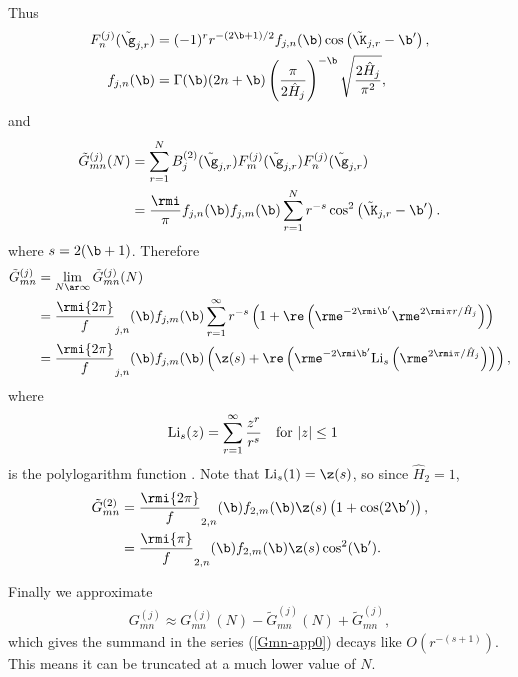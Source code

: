 \documentclass[a4paper,10pt]{article}
\begin{document}
Thus
\begin{subequations}
\begin{align}
F_n^{(j)}(\tilde \g_{j,r})&=
(-1)^{r}r^{-(2\b+1)/2}f_{j,n}(\b)\cos\left(\tilde\K_{j,r}-\b'\right),\\
f_{j,n}(\b)&=\Gamma(\b)(2n+\b)\left(\frac\pi{2\hat H_{j}}\right)^{-\b}
\sqrt{\frac{2\hat H_{j}}{\pi^{2} }},
\end{align}
\end{subequations}
and
\begin{align}\label{Gmn-app0}
\tilde G_{mn}^{(j)}(N)
 &=\sum_{r=1}^{N}B_j^{(2)}(\tilde\g_{j,r})F_m^{(j)}(\tilde\g_{j,r})F^{(j)}_n(\tilde\g_{j,r})
 \notag\\
 &=\frac\rmi\pi f_{j,n}(\b)f_{j,m}(\b)\sum_{r=1}^{N}r^{-s}
 \cos^{2}\left(\tilde\K_{j,r}-\b'\right).
 \end{align}
where $s=2(\b+1)$.
Therefore
\begin{align}\label{Gmn-app}
\tilde G_{mn}^{(j)}
&=\lim_{N\ar\infty}\tilde G_{mn}^{(j)}(N)
\notag\\
 &=\frac\rmi{2\pi} f_{j,n}(\b)f_{j,m}(\b)\sum_{r=1}^{\infty}r^{-s}
 \left (1+\re\left (\rme^{-2\rmi\b'} \rme^{2\rmi\pi r/\hat H_{j}}\right)\right)
\notag\\
 &=\frac\rmi{2\pi} f_{j,n}(\b)f_{j,m}(\b)
 \left ( \z(s)+\re\left (\rme^{-2\rmi\b'}{\rm Li}_{s} \left(\rme^{2\rmi\pi /\hat H_{j}}\right)\right)\right),
 \end{align}
 where
\begin{align}
{\rm Li}_{s}(z)&=\sum_{r=1}^{\infty}\frac{z^{r}}{r^{s}}
\quad\text{for }|z|\leq1
\end{align}
is the polylogarithm function \cite[][also see the next section]{wood1992-polylog-techrep}. Note that ${\rm Li}_{s}(1)=\z(s)$,
so since $\hat H_{2}=1$,
\begin{align}\label{Gmn-app}
\tilde G_{mn}^{(2)}
&=\frac\rmi{2\pi} f_{2,n}(\b)f_{2,m}(\b)\z(s)
 \left ( 1+\cos(2\b')\right),
 \notag\\
 &=\frac\rmi{\pi} f_{2,n}(\b)f_{2,m}(\b)\z(s)\cos^{2}(\b').
 \end{align}
 
 Finally we approximate
 \begin{align}
G_{mn}^{(j)}\approx G_{mn}^{(j)}(N)-\tilde G_{mn}^{(j)}(N)+ \tilde G_{mn}^{(j)},
\end{align}
which gives the summand in the series (\ref{Gmn-app0}) decays like $O(r^{-(s+1)})$.
This means it can be truncated at a much lower value of $N$.%
\end{document}
